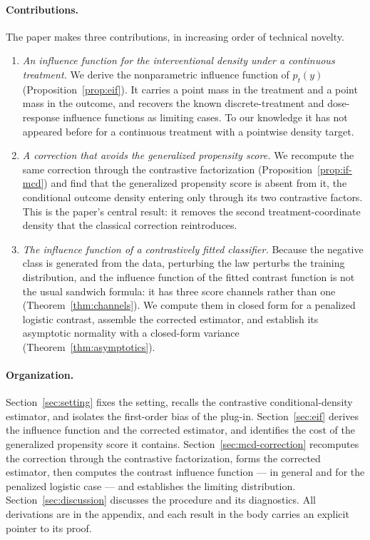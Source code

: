 \documentclass[11pt]{article}
\theoremstyle{plain}
\theoremstyle{definition}
\theoremstyle{remark}
\begin{document}
\paragraph{Contributions.}
The paper makes three contributions, in increasing order of technical novelty.
\begin{enumerate}
\item[(C1)] \emph{An influence function for the interventional density under a continuous
treatment.} We derive the nonparametric influence function of $p_t(y)$
(Proposition~\ref{prop:eif}). It carries a point mass in the treatment and a point mass in
the outcome, and recovers the known discrete-treatment and dose-response influence functions
as limiting cases. To our knowledge it has not appeared before for a continuous treatment
with a pointwise density target.
\item[(C2)] \emph{A correction that avoids the generalized propensity score.} We recompute
the same correction through the contrastive factorization (Proposition~\ref{prop:if-mcd}) and
find that the generalized propensity score is absent from it, the conditional outcome density
entering only through its two contrastive factors. This is the paper's central result: it
removes the second treatment-coordinate density that the classical correction reintroduces.
\item[(C3)] \emph{The influence function of a contrastively fitted classifier.} Because the
negative class is generated from the data, perturbing the law perturbs the training
distribution, and the influence function of the fitted contrast function is not the usual
sandwich formula: it has three score channels rather than one (Theorem~\ref{thm:channels}).
We compute them in closed form for a penalized logistic contrast, assemble the corrected
estimator, and establish its asymptotic normality with a closed-form variance
(Theorem~\ref{thm:asymptotics}).
\end{enumerate}

\paragraph{Organization.}
Section~\ref{sec:setting} fixes the setting, recalls the contrastive conditional-density
estimator, and isolates the first-order bias of the plug-in. Section~\ref{sec:eif} derives
the influence function and the corrected estimator, and identifies the cost of the
generalized propensity score it contains. Section~\ref{sec:mcd-correction} recomputes the
correction through the contrastive factorization, forms the corrected estimator, then computes
the contrast influence function --- in general and for the penalized logistic case --- and
establishes the limiting distribution.
Section~\ref{sec:discussion} discusses the procedure and its diagnostics. All derivations are
in the appendix, and each result in the body carries an explicit pointer to its proof.
\end{document}
